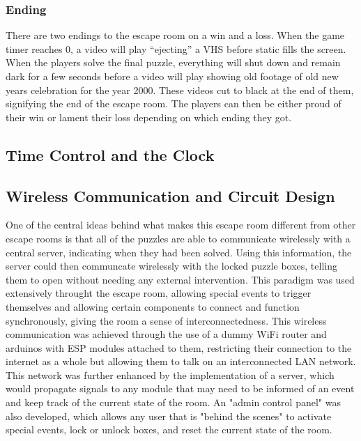 \documentclass[conference]{IEEEtran}
\begin{document}
\subsubsection{Ending}

\indent There are two endings to the escape room on a win and a loss. When the game timer reaches 0, a video will play ``ejecting'' a VHS before static
fills the screen. When the players solve the final puzzle, everything will shut down and remain dark for a few seconds before a video will play showing old
footage of old new years celebration for the year 2000. These videos cut to black at the end of them, signifying the end of the escape room. The players can
then be either proud of their win or lament their loss depending on which ending they got. 

\subsection{Time Control and the Clock} %

\subsection{Wireless Communication and Circuit Design} %
One of the central ideas behind what makes this escape room different from other escape rooms is that all of the puzzles are able to communicate
wirelessly with a central server, indicating when they had been solved. Using this information, the server could then communcate wirelessly with
the locked puzzle boxes, telling them to open without needing any external intervention. This paradigm was used extensively throught the escape
room, allowing special events to trigger themselves and allowing certain components to connect and function synchronously, giving the room a 
sense of interconnectedness. This wireless communication was achieved through the use of a dummy WiFi router and arduinos with ESP modules
attached to them, restricting their connection to the internet as a whole but allowing them to talk on an interconnected LAN network.
\\
\indent This network was further enhanced by the implementation of a server, which would propagate signals to any module that may need to be informed
of an event and keep track of the current state of the room. An "admin control panel" was also developed, which allows any user that is "behind the
scenes" to activate special events, lock or unlock boxes, and reset the current state of the room.
\end{document}
